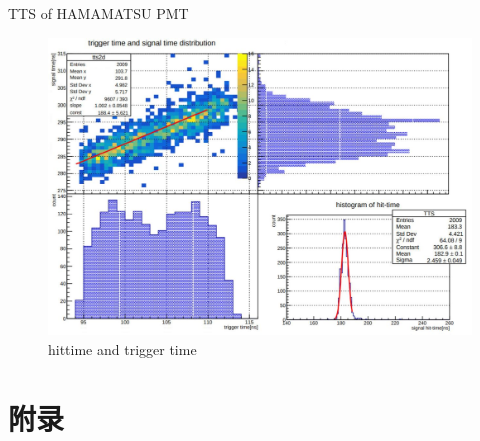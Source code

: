 \begin{frame}{TTS of HAMAMATSU PMT}
\begin{figure}
\centering
\includegraphics[width=.8\textwidth]{figures/hamtts.JPG} %
\caption{hittime and trigger time}
\end{figure}
\end{frame}

\appendix

\section*{附录}
